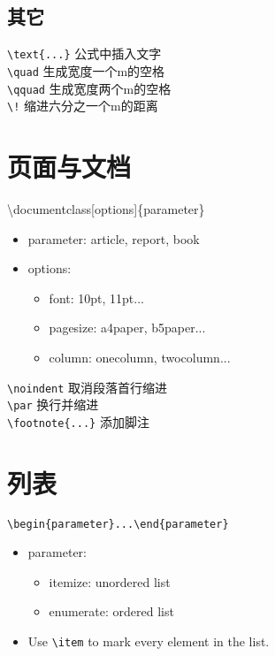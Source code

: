 \documentclass[a4paper,10pt]{ctexart}
\newcommand{\s}{\textbackslash}
\begin{document}
\subsection{其它}
\noindent
\verb|\text{...}| 公式中插入文字\\
\verb|\quad| 生成宽度一个m的空格\\
\verb|\qquad| 生成宽度两个m的空格\\
\verb|\!| 缩进六分之一个m的距离\\



\section{页面与文档}

\noindent
\s documentclass[options]\{parameter\}
\begin{itemize}
	\item parameter: article, report, book
	\item options:
	\begin{itemize}
		\item font: 10pt, 11pt...
		\item pagesize: a4paper, b5paper...
		\item column: onecolumn, twocolumn...
	\end{itemize}
\end{itemize}
\verb|\noindent| 取消段落首行缩进\\
\verb|\par| 换行并缩进\\
\verb|\footnote{...}| 添加脚注\\

\section{列表}
\noindent
\verb|\begin{parameter}...\end{parameter}|
\begin{itemize}
	\item parameter:
	\begin{itemize}
		\item itemize: unordered list
		\item enumerate: ordered list
	\end{itemize}
	\item Use \verb|\item| to mark every element in the list.
\end{itemize}
\end{document}
